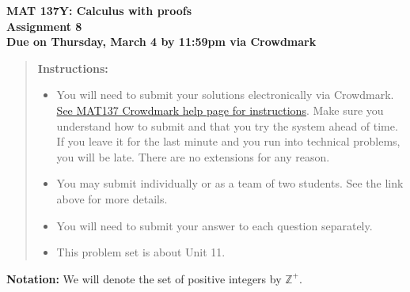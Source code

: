 \documentclass[12pt]{exam}
\newcommand{\Z}{\mathbb{Z}}
\begin{document}
{\large
	\begin{center}
		{\bf MAT 137Y: Calculus with proofs}\\
		{\bf Assignment 8} \\
		{\bf Due on Thursday, March 4 by 11:59pm via Crowdmark}
	\end{center}
}

\begin{quotation}
{\bf Instructions:}
	\begin{itemize}
		\item	 You will need to submit your solutions electronically via Crowdmark.   \href{https://www.math.toronto.edu/~alfonso/137/PS/137_CM.html}{See MAT137 Crowdmark help page for instructions}.  Make sure you understand how to submit and that you try the system ahead of time.  If you leave it for the last minute and you run into technical problems, you will be late.  There are no extensions for any reason.
		\item You may submit individually or as a team of two students.  See the link above for more details.
		\item  You will need to submit your answer to each question separately.
		\item  This problem set is about Unit 11.
	\end{itemize}
\end{quotation}

{\bf Notation:}  We will denote the set of positive integers by $\Z^+$.
\end{document}
